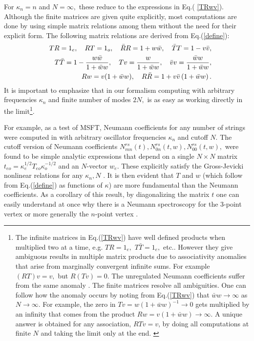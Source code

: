 \documentclass[a4paper,11pt]{article}
\begin{document}
For $\kappa _{n}=n$ and $N=\infty ,$ these reduce to the expressions in Eq.(%
\ref{TRwv}). Although the finite matrices are given quite explicitly, most
computations are done by using simple matrix relations among them without
the need for their explicit form. The following matrix relations are derived
\cite{BM2} from Eq.(\ref{define}):
\begin{eqnarray}
&&TR=1_{e},\quad RT=1_{o},\quad \bar{R}R=1+w\bar{w},\quad \bar{T}T=1-v\bar{v}%
,  \notag \\
&&T\bar{T}=1-\frac{w\bar{w}}{1+\bar{w}w},\quad Tv=\frac{w}{1+\bar{w}w},\quad
\bar{v}v=\frac{\bar{w}w}{1+\bar{w}w},  \label{relations} \\
&&Rw=v(1+\bar{w}w),\quad R\bar{R}=1+v\bar{v}\left( 1+\bar{w}w\right) .
\notag
\end{eqnarray}%
It is important to emphasize that in our formalism computing with arbitrary
frequencies $\kappa _{n}$ and finite number of modes $2N,$ is as easy as
working directly in the limit\footnote{%
The infinite matrices in Eq.(\ref{TRwv}) have well defined products when
multiplied two at a time, e.g. $TR=1_{e},$ $T\bar{T}=1_{e},$ etc.. However
they give ambiguous results in multiple matrix products due to associativity
anomalies \cite{BM1} that arise from marginally convergent infinite sums.
For example $(RT)v=v,$ but $R\left( Tv\right) =0.$ The unregulated Neumann
coefficients suffer from the same anomaly \cite{hata}\cite{BM2}. The finite
matrices resolve all ambiguities. One can follow how the anomaly occurs by
noting from Eq.(\ref{TRwv}) that $\bar{w}w\rightarrow \infty $ as $%
N\rightarrow \infty .$ For example, the zero in $Tv=w\left( 1+\bar{w}%
w\right) ^{-1}\rightarrow 0$ gets multiplied by an infinity that comes from
the product $Rw=v\left( 1+\bar{w}w\right) \rightarrow \infty .$ A unique
answer is obtained for any association, $RTv=v$, by doing all computations
at finite $N$ and taking the limit only at the end. \label{anom}}.

For example, as a test of MSFT, Neumann coefficients for any number of
strings were computed in \cite{BM2} with arbitrary oscillator frequencies $%
\kappa _{n}$ and cutoff $N.$ The cutoff version of Neumann coefficients $%
N_{mn}^{rs}\left( t\right) ,N_{0n}^{rs}\left( t,w\right) ,N_{00}^{rs}\left(
t,w\right) ,$ were found to be simple analytic expressions that depend on a
single $N\times N$ matrix $t_{eo}=\kappa _{e}^{1/2}T_{eo}\kappa _{o}^{-1/2}$
and an $N$-vector $w_e$. These explicitly satisfy the Gross-Jevicki nonlinear
relations for any $\kappa _{n},N$ \cite{BM2}. It is then evident that $T$
and $w$ (which follow from Eq.(\ref{define}) as functions of $\kappa $) are
more fundamental than the Neumann coefficients. As a corollary of this
result, by diagonalizing the matrix $t$ \cite{BM2} one can easily understand
at once why there is a Neumann spectroscopy for the 3-point vertex \cite%
{spectroscopy} or more generally the $n$-point vertex \cite{BM2}.
\end{document}
